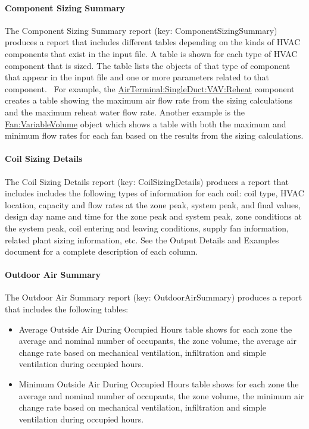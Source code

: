 \paragraph{Component Sizing Summary}\label{component-sizing-summary}

The Component Sizing Summary report (key: ComponentSizingSummary) produces a report that includes different tables depending on the kinds of HVAC components that exist in the input file. A table is shown for each type of HVAC component that is sized. The table lists the objects of that type of component that appear in the input file and one or more parameters related to that component.~ For example, the \hyperref[airterminalsingleductvavreheat]{AirTerminal:SingleDuct:VAV:Reheat} component creates a table showing the maximum air flow rate from the sizing calculations and the maximum reheat water flow rate. Another example is the \hyperref[fanvariablevolume]{Fan:VariableVolume} object which shows a table with both the maximum and minimum flow rates for each fan based on the results from the sizing calculations.

\paragraph{Coil Sizing Details}\label{coil-sizing-details}

The Coil Sizing Details report (key: CoilSizingDetails) produces a report that includes includes the following types of information for each coil: coil type, HVAC location, capacity and flow rates at the zone peak, system peak, and final values, design day name and time for the zone peak and system peak, zone conditions at the system peak, coil entering and leaving conditions, supply fan information, related plant sizing information, etc. See the Output Details and Examples document for a complete description of each column.

\paragraph{Outdoor Air Summary}\label{outdoor-air-summary}

The Outdoor Air Summary report (key: OutdoorAirSummary) produces a report that includes the following tables:

\begin{itemize}
\item
  Average Outside Air During Occupied Hours table shows for each zone the average and nominal number of occupants, the zone volume, the average air change rate based on mechanical ventilation, infiltration and simple ventilation during occupied hours.
\item
  Minimum Outside Air During Occupied Hours table shows for each zone the average and nominal number of occupants, the zone volume, the minimum air change rate based on mechanical ventilation, infiltration and simple ventilation during occupied hours.
\end{itemize}

